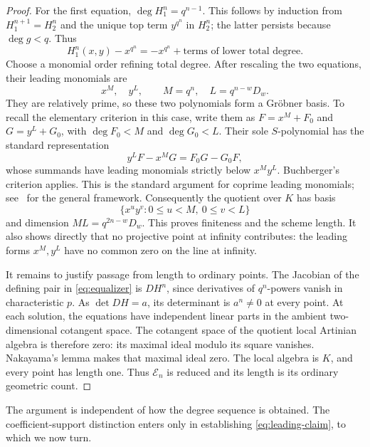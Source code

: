 \begin{proof}
For the first equation, $\deg H_1^n=q^{n-1}$. This follows by induction
from $H_1^{n+1}=H_2^n$ and the unique top term $y^{q^n}$ in $H_2^n$;
the latter persists because $\deg g<q$. Thus
\begin{equation}\label{eq:first-leading}
 H_1^n(x,y)-x^{q^n}
 =-x^{q^n}+\text{terms of lower total degree}.
\end{equation}
Choose a monomial order refining total degree. After rescaling the
two equations, their leading monomials are
\[
 x^M,\quad y^L,\qquad M=q^n,\quad L=q^{n-w}D_w.
\]
They are relatively prime, so these two polynomials form a Gr\"obner
basis. To recall the elementary criterion in this case, write them
as $F=x^M+F_0$ and $G=y^L+G_0$, with $\deg F_0<M$ and $\deg G_0<L$.
Their sole $S$-polynomial has the standard representation
\[
 y^L F-x^M G=F_0G-G_0F,
\]
whose summands have leading monomials strictly below $x^My^L$.
Buchberger's criterion applies. This is the standard argument for
coprime leading monomials; see~\cite{CLO2015} for the general framework.
Consequently the quotient over $K$ has basis
\begin{equation}\label{eq:rectangle-basis}
 \{x^u y^v:0\le u<M,\ 0\le v<L\}
\end{equation}
and dimension $ML=q^{2n-w}D_w$. This proves finiteness and the
scheme length. It also shows directly that no projective point at
infinity contributes: the leading forms $x^M,y^L$ have no common
zero on the line at infinity.

It remains to justify passage from length to ordinary points. The
Jacobian of the defining pair in \eqref{eq:equalizer} is $DH^n$,
since derivatives of $q^n$-powers vanish in characteristic $p$.
As $\det DH=a$, its determinant is $a^n\ne0$ at every point.
At each solution, the equations have independent linear parts in
the ambient two-dimensional cotangent space. The cotangent space
of the quotient local Artinian algebra is therefore zero: its
maximal ideal modulo its square vanishes. Nakayama's lemma makes
that maximal ideal zero. The local algebra is $K$, and every
point has length one. Thus $\mathcal E_n$ is reduced and its
length is its ordinary geometric count.
\end{proof}

The argument is independent of how the degree sequence is obtained.
The coefficient-support distinction enters only in establishing
\eqref{eq:leading-claim}, to which we now turn.
